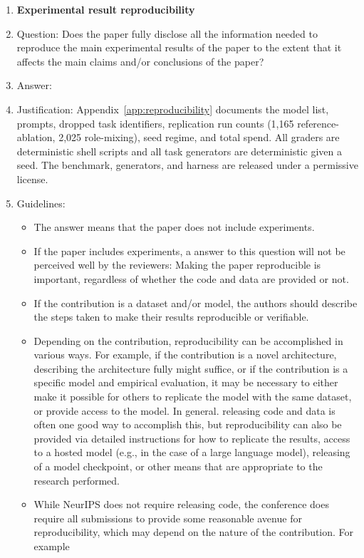 \begin{enumerate}
\item {\bf Experimental result reproducibility}
    \item[] Question: Does the paper fully disclose all the information needed to reproduce the main experimental results of the paper to the extent that it affects the main claims and/or conclusions of the paper?
    \item[] Answer: \answerYes{}
    \item[] Justification: Appendix~\ref{app:reproducibility} documents the model list, prompts, dropped task identifiers, replication run counts (1{,}165 reference-ablation, 2{,}025 role-mixing), seed regime, and total spend. All graders are deterministic shell scripts and all task generators are deterministic given a seed. The benchmark, generators, and harness are released under a permissive license.
    \item[] Guidelines:
    \begin{itemize}
        \item The answer \answerNA{} means that the paper does not include experiments.
        \item If the paper includes experiments, a \answerNo{} answer to this question will not be perceived well by the reviewers: Making the paper reproducible is important, regardless of whether the code and data are provided or not.
        \item If the contribution is a dataset and\slash or model, the authors should describe the steps taken to make their results reproducible or verifiable. 
        \item Depending on the contribution, reproducibility can be accomplished in various ways. For example, if the contribution is a novel architecture, describing the architecture fully might suffice, or if the contribution is a specific model and empirical evaluation, it may be necessary to either make it possible for others to replicate the model with the same dataset, or provide access to the model. In general. releasing code and data is often one good way to accomplish this, but reproducibility can also be provided via detailed instructions for how to replicate the results, access to a hosted model (e.g., in the case of a large language model), releasing of a model checkpoint, or other means that are appropriate to the research performed.
        \item While NeurIPS does not require releasing code, the conference does require all submissions to provide some reasonable avenue for reproducibility, which may depend on the nature of the contribution. For example

\end{itemize}
\end{enumerate}

